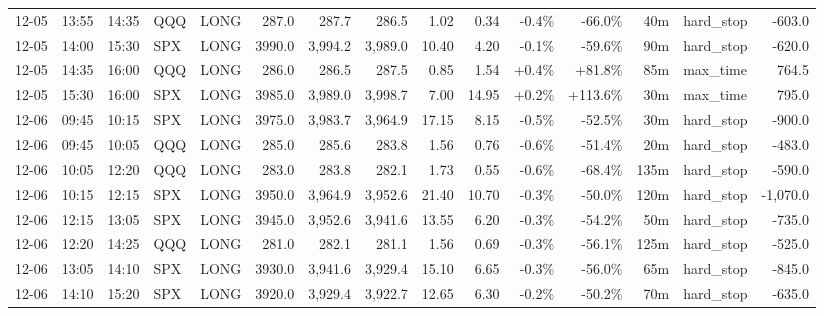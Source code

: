 \documentclass[11pt,a4paper,twoside]{article}
\begin{document}
\begin{landscape}
\begin{center}
\begin{longtable}{>{\color{txtmain}}l l l l l r r r r r r r r >{\color{txtmain}}l r}
12-05 & 13:55 & 14:35 & QQQ & LONG & 287.0 & 287.7 & 286.5 & 1.02 & 0.34 & \textcolor{lossred}{-0.4\%} & \textcolor{lossred}{-66.0\%} & 40m & hard\_stop & \textcolor{lossred}{-603.0} \\
12-05 & 14:00 & 15:30 & SPX & LONG & 3990.0 & 3,994.2 & 3,989.0 & 10.40 & 4.20 & \textcolor{lossred}{-0.1\%} & \textcolor{lossred}{-59.6\%} & 90m & hard\_stop & \textcolor{lossred}{-620.0} \\
12-05 & 14:35 & 16:00 & QQQ & LONG & 286.0 & 286.5 & 287.5 & 0.85 & 1.54 & \textcolor{wingreen}{+0.4\%} & \textcolor{wingreen}{+81.8\%} & 85m & max\_time & \textcolor{wingreen}{764.5} \\
12-05 & 15:30 & 16:00 & SPX & LONG & 3985.0 & 3,989.0 & 3,998.7 & 7.00 & 14.95 & \textcolor{wingreen}{+0.2\%} & \textcolor{wingreen}{+113.6\%} & 30m & max\_time & \textcolor{wingreen}{795.0} \\
12-06 & 09:45 & 10:15 & SPX & LONG & 3975.0 & 3,983.7 & 3,964.9 & 17.15 & 8.15 & \textcolor{lossred}{-0.5\%} & \textcolor{lossred}{-52.5\%} & 30m & hard\_stop & \textcolor{lossred}{-900.0} \\
12-06 & 09:45 & 10:05 & QQQ & LONG & 285.0 & 285.6 & 283.8 & 1.56 & 0.76 & \textcolor{lossred}{-0.6\%} & \textcolor{lossred}{-51.4\%} & 20m & hard\_stop & \textcolor{lossred}{-483.0} \\
12-06 & 10:05 & 12:20 & QQQ & LONG & 283.0 & 283.8 & 282.1 & 1.73 & 0.55 & \textcolor{lossred}{-0.6\%} & \textcolor{lossred}{-68.4\%} & 135m & hard\_stop & \textcolor{lossred}{-590.0} \\
12-06 & 10:15 & 12:15 & SPX & LONG & 3950.0 & 3,964.9 & 3,952.6 & 21.40 & 10.70 & \textcolor{lossred}{-0.3\%} & \textcolor{lossred}{-50.0\%} & 120m & hard\_stop & \textcolor{lossred}{-1,070.0} \\
12-06 & 12:15 & 13:05 & SPX & LONG & 3945.0 & 3,952.6 & 3,941.6 & 13.55 & 6.20 & \textcolor{lossred}{-0.3\%} & \textcolor{lossred}{-54.2\%} & 50m & hard\_stop & \textcolor{lossred}{-735.0} \\
12-06 & 12:20 & 14:25 & QQQ & LONG & 281.0 & 282.1 & 281.1 & 1.56 & 0.69 & \textcolor{lossred}{-0.3\%} & \textcolor{lossred}{-56.1\%} & 125m & hard\_stop & \textcolor{lossred}{-525.0} \\
12-06 & 13:05 & 14:10 & SPX & LONG & 3930.0 & 3,941.6 & 3,929.4 & 15.10 & 6.65 & \textcolor{lossred}{-0.3\%} & \textcolor{lossred}{-56.0\%} & 65m & hard\_stop & \textcolor{lossred}{-845.0} \\
12-06 & 14:10 & 15:20 & SPX & LONG & 3920.0 & 3,929.4 & 3,922.7 & 12.65 & 6.30 & \textcolor{lossred}{-0.2\%} & \textcolor{lossred}{-50.2\%} & 70m & hard\_stop & \textcolor{lossred}{-635.0} \\

\end{longtable}
\end{center}
\end{landscape}
\end{document}
